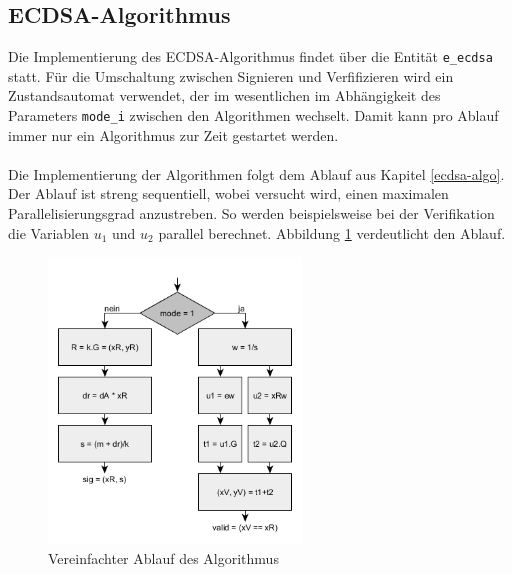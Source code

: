 \subsection{ECDSA-Algorithmus}

Die Implementierung des ECDSA-Algorithmus findet über die Entität \texttt{e\_ecdsa} statt. Für die Umschaltung zwischen Signieren und Verfifizieren wird ein Zustandsautomat verwendet, der im wesentlichen im Abhängigkeit des Parameters \texttt{mode\_i} zwischen den Algorithmen wechselt. Damit kann pro Ablauf immer nur ein Algorithmus zur Zeit gestartet werden.
\\ \\
Die Implementierung der Algorithmen folgt dem Ablauf aus Kapitel \ref{ecdsa-algo}. Der Ablauf ist streng sequentiell, wobei versucht wird, einen maximalen Parallelisierungsgrad anzustreben. So werden beispielsweise bei der Verifikation die Variablen $u_1$ und $u_2$ parallel berechnet. Abbildung \ref{fig:vhdl-impl-ecdsa} verdeutlicht den Ablauf.

\begin{figure}[thb]
	\centering
	\includegraphics[width=0.6\textwidth]{bilder/vhdl_ecdsa.png}
	\caption{Vereinfachter Ablauf des Algorithmus}
	\label{fig:vhdl-impl-ecdsa}
\end{figure}

